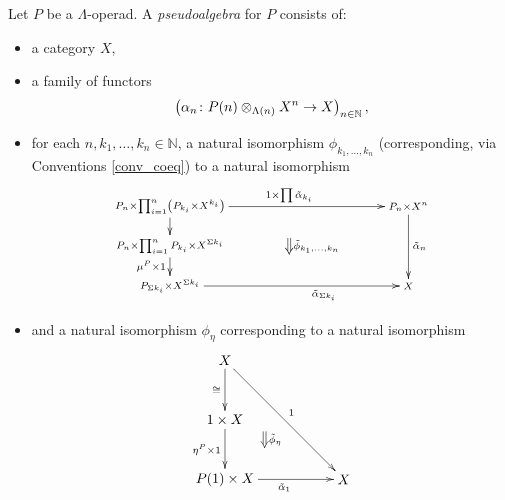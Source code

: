 \begin{Defi}\label{def:ps-alg}
Let $P$ be a $\Lambda$-operad. A \textit{pseudoalgebra} for $P$ consists of: 
    \begin{itemize}
        \item a category $X$,
        \item a family of functors
            \[
                \left(\alpha_n \colon P(n) \otimes_{\Lambda(n)} X^{n} \rightarrow X \right)_{n \in \mathbb{N}},
            \]
        \item for each $n, k_1, \ldots, k_n \in \mathbb{N}$, a natural isomorphism $\phi_{k_1, \ldots, k_n}$ (corresponding, via Conventions \ref{conv_coeq}) to a natural isomorphism
            \[
                \xy
                    (0,0)*+{\scriptstyle P_n \times \prod_{i=1}^n \left(P_{k_i} \times X^{k_i}\right)}="00";
                    (0,-10)*+{\scriptstyle P_n \times \prod_{i=1}^n P_{k_i} \times X^{\Sigma k_i}}="01";
                    (0,-20)*+{\scriptstyle P_{\Sigma k_i} \times X^{\Sigma k_i}}="02";
                    (60,-20)*+{\scriptstyle X}="12";
                    (60,0)*+{\scriptstyle P_n \times X^n}="11";
                    {\ar_{} "00" ; "01"};
                    {\ar^{1 \times \prod \tilde{\alpha}_{k_i}} "00" ; "11"};
                    {\ar^{\tilde{\alpha}_n} "11" ; "12"};
                    {\ar_{\mu^P \times 1} "01" ; "02"};
                    {\ar_>>>>>>>>>>>>>>>>>>>{\tilde{\alpha}_{\Sigma k_i}} "02" ; "12"};
                    {\ar@{=>}^{\tilde{\phi}_{k_1, \ldots, k_n}} (30,-8) ; (30,-12)};
                \endxy
            \]

               \item and a natural isomorphism $\phi_{\eta}$ corresponding to a natural isomorphism
            \[
                \xy
                    (0,0)*+{X}="00";
                    (0,-15)*+{1 \times X}="x10";
                    (0,-30)*+{P(1) \times X}="10";
                    (30,-30)*+{X}="11";
                    {\ar_{\eta^P \times 1} "x10" ; "10"};
                    {\ar_{\tilde{\alpha}_1} "10" ; "11"};
                    {\ar^{1} "00" ; "11"};
                    {\ar_{\cong} "00" ; "x10"};
                    {\ar@{=>}^{\tilde{\phi}_\eta} (10,-18) ; (10,-22)};
                \endxy
            \]


\end{itemize}
\end{Defi}
